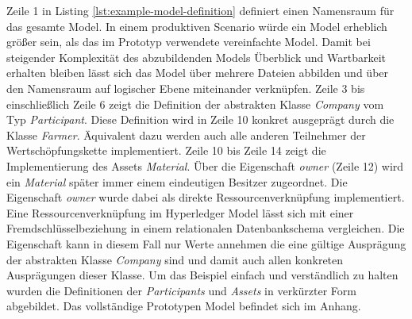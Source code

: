 Zeile 1 in Listing \ref{lst:example-model-definition} definiert einen Namensraum für das gesamte Model. In einem produktiven Scenario würde ein Model erheblich größer sein, als das im Prototyp verwendete vereinfachte Model. Damit bei steigender Komplexität des abzubildenden Models Überblick und Wartbarkeit erhalten bleiben lässt sich das Model über mehrere Dateien abbilden und über den Namensraum auf logischer Ebene miteinander verknüpfen. Zeile 3 bis einschließlich Zeile 6 zeigt die Definition der abstrakten Klasse \textit{Company} vom Typ \textit{Participant}. Diese Definition wird in Zeile 10 konkret ausgeprägt durch die Klasse \textit{Farmer}. Äquivalent dazu werden auch alle anderen Teilnehmer der Wertschöpfungskette implementiert. Zeile 10 bis Zeile 14 zeigt die Implementierung des Assets \textit{Material}. Über die Eigenschaft \textit{owner} (Zeile 12) wird ein \textit{Material} später immer einem eindeutigen Besitzer zugeordnet. Die Eigenschaft \textit{owner} wurde dabei als direkte Ressourcenverknüpfung implementiert. Eine Ressourcenverknüpfung im Hyperledger Model lässt sich mit einer Fremdschlüsselbeziehung in einem relationalen Datenbankschema vergleichen. Die Eigenschaft kann in diesem Fall nur Werte annehmen die eine gültige Ausprägung der abstrakten Klasse \textit{Company} sind und damit auch allen konkreten Ausprägungen dieser Klasse. Um das Beispiel einfach und verständlich zu halten wurden die Definitionen der \textit{Participants} und \textit{Assets} in verkürzter Form abgebildet. Das vollständige Prototypen Model befindet sich im Anhang.

